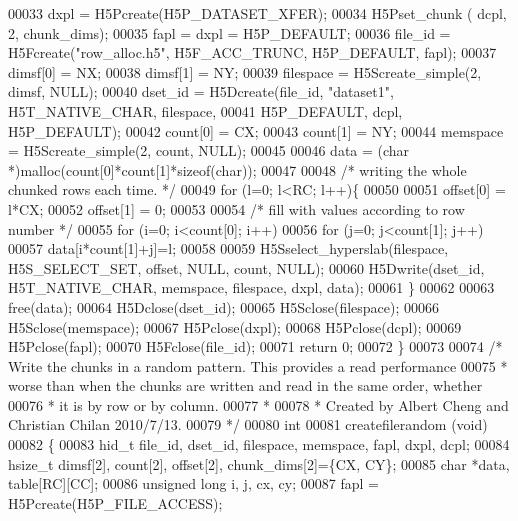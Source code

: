 \begin{DoxyCode}
00033     dxpl = H5Pcreate(H5P\_DATASET\_XFER);
00034     H5Pset\_chunk ( dcpl, 2, chunk\_dims);
00035     fapl = dxpl = H5P\_DEFAULT;
00036     file\_id = H5Fcreate(\textcolor{stringliteral}{"row\_alloc.h5"}, H5F\_ACC\_TRUNC, H5P\_DEFAULT, fapl);
00037     dimsf[0] = NX;
00038     dimsf[1] = NY;
00039     filespace = H5Screate\_simple(2, dimsf, NULL); 
00040     dset\_id = H5Dcreate(file\_id, \textcolor{stringliteral}{"dataset1"}, H5T\_NATIVE\_CHAR, filespace,
00041             H5P\_DEFAULT, dcpl, H5P\_DEFAULT);
00042     count[0] = CX;
00043     count[1] = NY;
00044     memspace = H5Screate\_simple(2, count, NULL);
00045 
00046     data = (\textcolor{keywordtype}{char} *)malloc(count[0]*count[1]*\textcolor{keyword}{sizeof}(\textcolor{keywordtype}{char}));
00047     
00048     \textcolor{comment}{/* writing the whole chunked rows each time. */}
00049     \textcolor{keywordflow}{for} (l=0; l<RC; l++)\{
00050 
00051         offset[0] = l*CX;
00052         offset[1] = 0;
00053 
00054     \textcolor{comment}{/* fill with values according to row number */}
00055     \textcolor{keywordflow}{for} (i=0; i<count[0]; i++)
00056         \textcolor{keywordflow}{for} (j=0; j<count[1]; j++)
00057         data[i*count[1]+j]=l;
00058 
00059         H5Sselect\_hyperslab(filespace, H5S\_SELECT\_SET, offset, NULL, count, NULL);
00060         H5Dwrite(dset\_id, H5T\_NATIVE\_CHAR, memspace, filespace, dxpl, data);
00061     \} 
00062  
00063     free(data);
00064     H5Dclose(dset\_id);
00065     H5Sclose(filespace);
00066     H5Sclose(memspace);
00067     H5Pclose(dxpl);
00068     H5Pclose(dcpl);
00069     H5Pclose(fapl);
00070     H5Fclose(file\_id);
00071     \textcolor{keywordflow}{return} 0;
00072 \}
00073 
00074 \textcolor{comment}{/* Write the chunks in a random pattern.  This provides a read performance}
00075 \textcolor{comment}{ * worse than when the chunks are written and read in the same order, whether}
00076 \textcolor{comment}{ * it is by row or by column.}
00077 \textcolor{comment}{ *}
00078 \textcolor{comment}{ * Created by Albert Cheng and Christian Chilan 2010/7/13.}
00079 \textcolor{comment}{ */}
00080 \textcolor{keywordtype}{int}
00081 createfilerandom (\textcolor{keywordtype}{void})
00082 \{
00083     hid\_t   file\_id, dset\_id, filespace, memspace, fapl, dxpl, dcpl;
00084     hsize\_t dimsf[2], count[2], offset[2], chunk\_dims[2]=\{CX, CY\};
00085     \textcolor{keywordtype}{char}     *data, table[RC][CC];               
00086     \textcolor{keywordtype}{unsigned} \textcolor{keywordtype}{long} i, j, cx, cy;
00087     fapl = H5Pcreate(H5P\_FILE\_ACCESS);

\end{DoxyCode}
